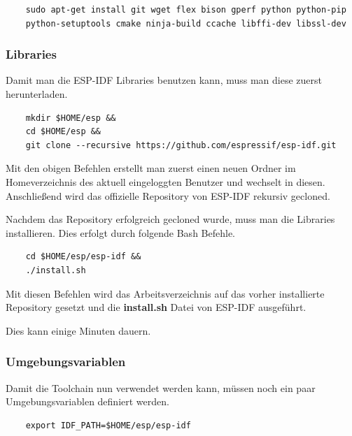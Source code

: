 \vspace*{10px}
\begin{verbatim}
    sudo apt-get install git wget flex bison gperf python python-pip 
    python-setuptools cmake ninja-build ccache libffi-dev libssl-dev
\end{verbatim}
\vspace*{10px}

\subsubsection{Libraries}\label{sec:libraries}

Damit man die ESP-IDF Libraries benutzen kann, muss man diese zuerst herunterladen.

\vspace*{10px}
\begin{verbatim}
    mkdir $HOME/esp &&
    cd $HOME/esp &&
    git clone --recursive https://github.com/espressif/esp-idf.git
\end{verbatim}
\vspace*{10px}

Mit den obigen Befehlen erstellt man zuerst einen neuen Ordner im Homeverzeichnis des aktuell eingeloggten Benutzer und wechselt in diesen. 
Anschließend wird das offizielle Repository von ESP-IDF rekursiv gecloned.

Nachdem das Repository erfolgreich gecloned wurde, muss man die Libraries installieren. Dies erfolgt durch folgende Bash Befehle.

\vspace*{10px}
\begin{verbatim}
    cd $HOME/esp/esp-idf &&
    ./install.sh
\end{verbatim}
\vspace*{10px}

Mit diesen Befehlen wird das Arbeitsverzeichnis auf das vorher installierte Repository gesetzt und die \textbf{install.sh} Datei von ESP-IDF ausgeführt.

Dies kann einige Minuten dauern.

\subsubsection{Umgebungsvariablen}

Damit die Toolchain nun verwendet werden kann, müssen noch ein paar Umgebungsvariablen definiert werden. 

\vspace*{10px}
\begin{verbatim}
    export IDF_PATH=$HOME/esp/esp-idf
\end{verbatim}
\vspace*{10px}

